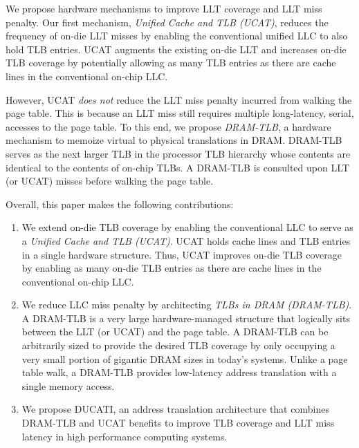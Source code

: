 We propose hardware mechanisms to improve LLT coverage and LLT miss
penalty. Our first mechanism, {\em Unified Cache and TLB (UCAT)},
reduces the frequency of on-die LLT misses by enabling the
conventional unified LLC to also hold TLB entries. UCAT augments the
existing on-die LLT and increases on-die TLB coverage by potentially
allowing as many TLB entries as there are cache lines in the
conventional on-chip LLC.


However, UCAT {\em does not} reduce the LLT miss penalty incurred from
walking the page table. This is because an LLT miss still requires
multiple long-latency, serial, accesses to the page table. To this
end, we propose {\em DRAM-TLB}, a hardware mechanism to memoize
virtual to physical translations in DRAM. DRAM-TLB serves as the next
larger TLB in the processor TLB hierarchy whose contents are identical
to the contents of on-chip TLBs. A DRAM-TLB is consulted upon LLT (or
UCAT) misses before walking the page table.



Overall, this paper makes the following contributions:

\begin{enumerate}

  \item{We extend on-die TLB coverage by enabling the conventional LLC
    to serve as a {\em Unified Cache and TLB (UCAT)}. UCAT holds cache
    lines and TLB entries in a single hardware structure. Thus, UCAT
    improves on-die TLB coverage by enabling as many on-die TLB
    entries as there are cache lines in the conventional on-chip LLC.}

  \item{We reduce LLC miss penalty by architecting {\em TLBs in DRAM
    (DRAM-TLB)}. A DRAM-TLB is a very large hardware-managed structure
    that logically sits between the LLT (or UCAT) and the page table.
    A DRAM-TLB can be arbitrarily sized to provide the desired TLB
    coverage by only occupying a very small portion of gigantic DRAM
    sizes in today's systems. Unlike a page table walk, a DRAM-TLB
    provides low-latency address translation with a single memory
    access. }


  \item{We propose DUCATI, an address translation architecture that
  combines DRAM-TLB and UCAT benefits to improve TLB coverage and LLT
  miss latency in high performance computing systems.}

\end{enumerate}

